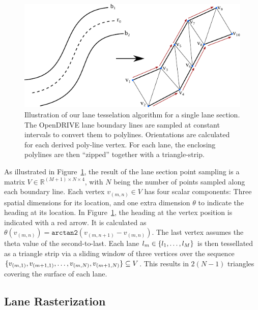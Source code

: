 \begin{figure}[htb]
    \centering
    \includegraphics[width=0.8\linewidth]{figures/tesselation}
    \caption{Illustration of our lane tesselation algorithm for a single lane section. The OpenDRIVE lane boundary lines are sampled at constant intervals to convert them to polylines. Orientations are calculated for each derived poly-line vertex. For each lane, the enclosing polylines are then \enquote{zipped} together with a triangle-strip.}
    \label{fig:tesselation}
\end{figure}

As illustrated in Figure~\ref{fig:tesselation}, the result of the lane section point sampling is a matrix $V \in \mathbb{R}^{(M+1) \times N \times 4}$, with $N$ being the number of points sampled along each boundary line.
Each vertex $v_{(m,n)} \in V$ has four scalar components: Three spatial dimensions for its location, and one extra dimension $\theta$ to indicate the heading at its location.
In Figure~\ref{fig:tesselation}, the heading at the vertex position is indicated with a red arrow.
It is calculated as $\theta(v_{(m,n)}) = \mathtt{arctan2}(v_{(m,n+1)} - v_{(m,n)})$.
The last vertex assumes the theta value of the second-to-last.
Each lane $l_m \in \{l_1,\mathellipsis,l_M\}$ is then tessellated as a triangle strip via a sliding window of three vertices over the sequence $\{v_{(m,1)}, v_{(m+1,1)}, \mathellipsis, v_{(m,N)}, v_{(m+1,N)}\} \subseteq V$.
This results in $2(N-1)$ triangles covering the surface of each lane.

\subsection{Lane Rasterization}
\label{subsec:rasterization}

